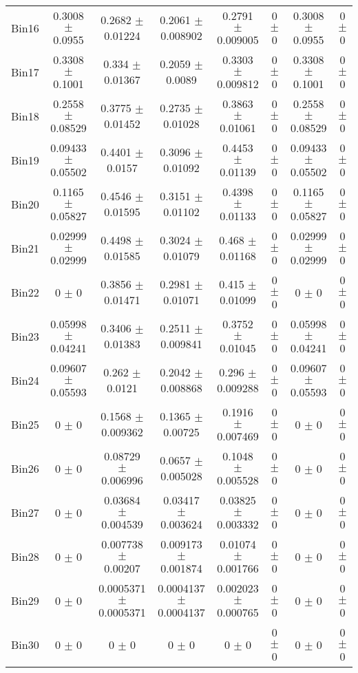 \begin{tabular}{@{\extracolsep{4pt}}lccccccc@{}}
     Bin16 & 0.3008 $\pm$ 0.0955 & 0.2682 $\pm$ 0.01224 & 0.2061 $\pm$ 0.008902 & 0.2791 $\pm$ 0.009005 & 0 $\pm$ 0 & 0.3008 $\pm$ 0.0955 & 0 $\pm$ 0 \\ 
     Bin17 & 0.3308 $\pm$ 0.1001 & 0.334 $\pm$ 0.01367 & 0.2059 $\pm$ 0.0089 & 0.3303 $\pm$ 0.009812 & 0 $\pm$ 0 & 0.3308 $\pm$ 0.1001 & 0 $\pm$ 0 \\ 
     Bin18 & 0.2558 $\pm$ 0.08529 & 0.3775 $\pm$ 0.01452 & 0.2735 $\pm$ 0.01028 & 0.3863 $\pm$ 0.01061 & 0 $\pm$ 0 & 0.2558 $\pm$ 0.08529 & 0 $\pm$ 0 \\ 
     Bin19 & 0.09433 $\pm$ 0.05502 & 0.4401 $\pm$ 0.0157 & 0.3096 $\pm$ 0.01092 & 0.4453 $\pm$ 0.01139 & 0 $\pm$ 0 & 0.09433 $\pm$ 0.05502 & 0 $\pm$ 0 \\ 
     Bin20 & 0.1165 $\pm$ 0.05827 & 0.4546 $\pm$ 0.01595 & 0.3151 $\pm$ 0.01102 & 0.4398 $\pm$ 0.01133 & 0 $\pm$ 0 & 0.1165 $\pm$ 0.05827 & 0 $\pm$ 0 \\ 
     Bin21 & 0.02999 $\pm$ 0.02999 & 0.4498 $\pm$ 0.01585 & 0.3024 $\pm$ 0.01079 & 0.468 $\pm$ 0.01168 & 0 $\pm$ 0 & 0.02999 $\pm$ 0.02999 & 0 $\pm$ 0 \\ 
     Bin22 & 0 $\pm$ 0 & 0.3856 $\pm$ 0.01471 & 0.2981 $\pm$ 0.01071 & 0.415 $\pm$ 0.01099 & 0 $\pm$ 0 & 0 $\pm$ 0 & 0 $\pm$ 0 \\ 
     Bin23 & 0.05998 $\pm$ 0.04241 & 0.3406 $\pm$ 0.01383 & 0.2511 $\pm$ 0.009841 & 0.3752 $\pm$ 0.01045 & 0 $\pm$ 0 & 0.05998 $\pm$ 0.04241 & 0 $\pm$ 0 \\ 
     Bin24 & 0.09607 $\pm$ 0.05593 & 0.262 $\pm$ 0.0121 & 0.2042 $\pm$ 0.008868 & 0.296 $\pm$ 0.009288 & 0 $\pm$ 0 & 0.09607 $\pm$ 0.05593 & 0 $\pm$ 0 \\ 
     Bin25 & 0 $\pm$ 0 & 0.1568 $\pm$ 0.009362 & 0.1365 $\pm$ 0.00725 & 0.1916 $\pm$ 0.007469 & 0 $\pm$ 0 & 0 $\pm$ 0 & 0 $\pm$ 0 \\ 
     Bin26 & 0 $\pm$ 0 & 0.08729 $\pm$ 0.006996 & 0.0657 $\pm$ 0.005028 & 0.1048 $\pm$ 0.005528 & 0 $\pm$ 0 & 0 $\pm$ 0 & 0 $\pm$ 0 \\ 
     Bin27 & 0 $\pm$ 0 & 0.03684 $\pm$ 0.004539 & 0.03417 $\pm$ 0.003624 & 0.03825 $\pm$ 0.003332 & 0 $\pm$ 0 & 0 $\pm$ 0 & 0 $\pm$ 0 \\ 
     Bin28 & 0 $\pm$ 0 & 0.007738 $\pm$ 0.00207 & 0.009173 $\pm$ 0.001874 & 0.01074 $\pm$ 0.001766 & 0 $\pm$ 0 & 0 $\pm$ 0 & 0 $\pm$ 0 \\ 
     Bin29 & 0 $\pm$ 0 & 0.0005371 $\pm$ 0.0005371 & 0.0004137 $\pm$ 0.0004137 & 0.002023 $\pm$ 0.000765 & 0 $\pm$ 0 & 0 $\pm$ 0 & 0 $\pm$ 0 \\ 
     Bin30 & 0 $\pm$ 0 & 0 $\pm$ 0 & 0 $\pm$ 0 & 0 $\pm$ 0 & 0 $\pm$ 0 & 0 $\pm$ 0 & 0 $\pm$ 0 \\ 
\hline\hline
  \end{tabular}
